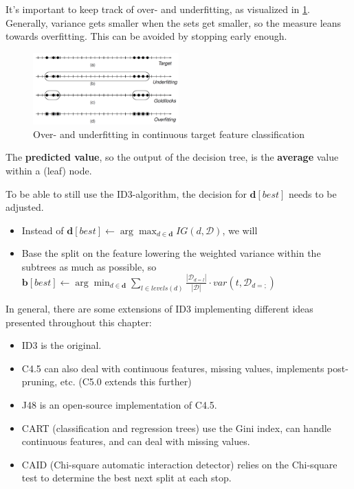 It's important to keep track of over- and underfitting, as visualized in \ref{fig:3_overunder_target}. Generally, variance gets smaller when the sets get smaller, so the measure leans towards overfitting. This can be avoided by stopping early enough.

\begin{figure}[h]
  \centering
  \includegraphics[width=0.5\textwidth]{assets/trees/cont/target_overunder.png}
  \caption{Over- and underfitting in continuous target feature classification}
  \label{fig:3_overunder_target}
\end{figure}

The \textbf{predicted value}, so the output of the decision tree, is the \textbf{average} value within a (leaf) node.

\begin{note}
To be able to still use the ID3-algorithm, the decision for $\mathbf{d}[best]$ needs to be adjusted.
\begin{itemize}
  \item Instead of $\mathbf{d}[best] \leftarrow \arg\max_{d\in\mathbf{d}} IG(d, \mathcal{D})$, we will
  \item Base the split on the feature lowering the weighted variance within the subtrees as much as possible, so $\mathbf{b}[best] \leftarrow \arg\min_{d\in\mathbf{d}}\sum_{l\in levels(d)}\frac{|\mathcal{D}_{d=l}|}{|\mathcal{D}|}\cdot var(t, \mathcal{D}_{d=;})$
\end{itemize}
In general, there are some extensions of ID3 implementing different ideas presented throughout this chapter:
\begin{itemize}
  \item ID3 is the original.
  \item C4.5 can also deal with continuous features, missing values, implements post-pruning, etc. (C5.0 extends this further)
  \item J48 is an open-source implementation of C4.5.
  \item CART (classification and regression trees) use the Gini index, can handle continuous features, and can deal with missing values.
  \item CAID (Chi-square automatic interaction detector) relies on the Chi-square test to determine the best next split at each stop.
\end{itemize}
\end{note}


